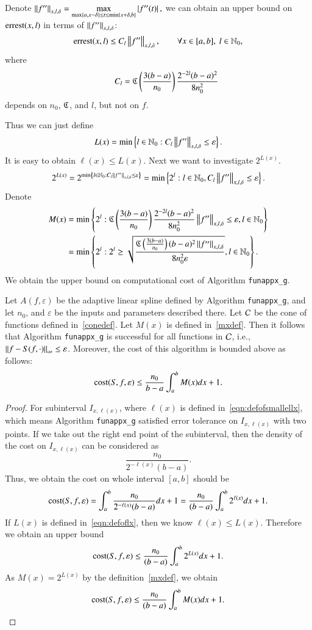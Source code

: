 Denote
$\norm[x,l,\delta]{f''}=\max\limits_{\max\{a,x-\delta\} \le t \le \min\{x+\delta, b\}}\abs{f''(t)},$
we can obtain an upper bound on $\errest(x,l)$ in terms of $\norm[x,l,\delta]{f''}$:
\[
 \errest(x,l)  \le C_l \norm[x,l,\delta]{f''}, \qquad \forall x \in [a,b], \ l \in \natzero,
\]
where
\[\qquad C_l=\fC\left(\frac{3(b-a)}{n_0}\right) \frac{2^{-2l}(b-a)^2}{8n^2_0}
\]
depends on $n_0$, $\fC$, and $l$, but not on $f$.

Thus we can just define
\begin{equation}\label{eqn:defoflx}
L(x) = \min \left\{ l \in \natzero : C_l \norm[x,l,\delta]{f''} \le \varepsilon\right\} .
\end{equation}
It is easy to obtain $\ell(x) \le L(x)$.
Next we want to investigate $2^{L(x)}$.
$$
2^{L(x)}=2^{\min \left\{ l \in \natzero : C_l \norm[x,l,\delta]{f''}\le \varepsilon\right\}} = \min\left\{2^l: l \in  \natzero, C_l \norm[x,l,\delta]{f''}\le \varepsilon\right\}.$$
Denote
\begin{align}\label{mxdef}
M(x) & = \min\left\{2^l:  \fC\left(\frac{3(b-a)}{n_0}\right) \frac{2^{-2l}(b-a)^2}{8n^2_0}\norm[x,l,\delta]{f''} \le \varepsilon,  l \in  \natzero\right\}\nonumber \\
 & = \min\left\{2^l:  2^l \ge \sqrt{\frac{\fC\left(\frac{3(b-a)}{n_0}\right)  (b-a)^2 \norm[x,l,\delta]{f''}}{8n^2_0\varepsilon}},  l \in  \natzero\right\}.
\end{align}
We obtain the upper bound on computational cost of Algorithm \texttt{funappx\_g}.

\begin{theorem}\label{thm:cost}
Let $A(f,\varepsilon)$ be the adaptive linear spline defined by Algorithm \textnormal{\texttt{funappx\_g}}, and let $n_0$, and $\varepsilon$ be the inputs and parameters described there. Let $\cc$ be the cone of functions defined in~\eqref{conedef}.
Let $M(x)$ is defined in~\eqref{mxdef}.
Then it follows that Algorithm \textnormal{\texttt{funappx\_g}} is successful for all functions in $\cc$,  i.e.,  $\norm[\infty]{f - S(f, \cdot)} \le \varepsilon$.  Moreover, the cost of this algorithm is bounded above as follows:
$$\cost(S,f,\varepsilon) \le \frac{n_0}{b-a}\int_a^b M(x) dx +1.$$
\end{theorem}

\begin{proof}
For subinterval $I_{x,\ell(x)}$, where $\ell(x)$ is defined in~\eqref{eqn:defofsmallellx},
which means Algorithm \texttt{funappx\_g} satisfied error tolerance on $I_{x,\ell(x)}$ with two points.
If we take out the right end point of the subinterval, then the density of the cost on $I_{x,\ell(x)}$ can be considered as
$$\frac{n_0}{2^{-\ell(x)}(b-a)}.$$
Thus, we obtain the cost on whole interval $[a,b]$ should be
$$\cost(S,f,\varepsilon)  = \int_a^b \frac{n_0}{2^{-\ell(x)}(b-a)}dx +1= \frac{n_0}{(b-a)}\int_a^b 2^{\ell(x)}dx +1.
$$
If $L(x)$ is defined in~\eqref{eqn:defoflx}, then we know $\ell(x) \le L(x)$. Therefore we obtain an upper bound
$$\cost(S,f,\varepsilon)  \le \frac{n_0}{(b-a)}\int_a^b 2^{L(x)}dx +1.
$$
As $M(x)=2^{L(x)}$ by the definition~\eqref{mxdef}, we obtain
$$\cost(S,f,\varepsilon)  \le \frac{n_0}{(b-a)}\int_a^b M(x) dx +1.
$$
\end{proof}

